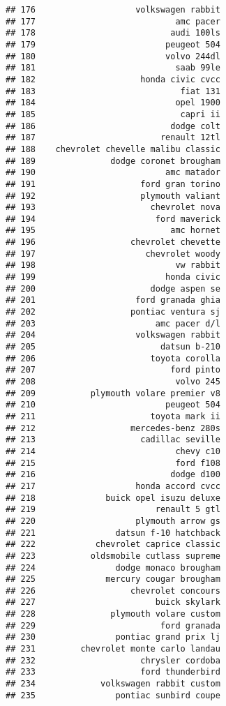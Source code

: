 \documentclass[
]{article}
\begin{document}
\begin{verbatim}
## 176                    volkswagen rabbit
## 177                            amc pacer
## 178                           audi 100ls
## 179                          peugeot 504
## 180                          volvo 244dl
## 181                            saab 99le
## 182                     honda civic cvcc
## 183                             fiat 131
## 184                            opel 1900
## 185                             capri ii
## 186                           dodge colt
## 187                         renault 12tl
## 188    chevrolet chevelle malibu classic
## 189               dodge coronet brougham
## 190                          amc matador
## 191                     ford gran torino
## 192                     plymouth valiant
## 193                       chevrolet nova
## 194                        ford maverick
## 195                           amc hornet
## 196                   chevrolet chevette
## 197                      chevrolet woody
## 198                            vw rabbit
## 199                          honda civic
## 200                       dodge aspen se
## 201                    ford granada ghia
## 202                   pontiac ventura sj
## 203                        amc pacer d/l
## 204                    volkswagen rabbit
## 205                         datsun b-210
## 206                       toyota corolla
## 207                           ford pinto
## 208                            volvo 245
## 209           plymouth volare premier v8
## 210                          peugeot 504
## 211                       toyota mark ii
## 212                   mercedes-benz 280s
## 213                     cadillac seville
## 214                            chevy c10
## 215                            ford f108
## 216                           dodge d100
## 217                    honda accord cvcc
## 218              buick opel isuzu deluxe
## 219                        renault 5 gtl
## 220                    plymouth arrow gs
## 221                datsun f-10 hatchback
## 222            chevrolet caprice classic
## 223           oldsmobile cutlass supreme
## 224                dodge monaco brougham
## 225              mercury cougar brougham
## 226                   chevrolet concours
## 227                        buick skylark
## 228               plymouth volare custom
## 229                         ford granada
## 230                pontiac grand prix lj
## 231         chevrolet monte carlo landau
## 232                     chrysler cordoba
## 233                     ford thunderbird
## 234             volkswagen rabbit custom
## 235                pontiac sunbird coupe

\end{verbatim}
\end{document}

